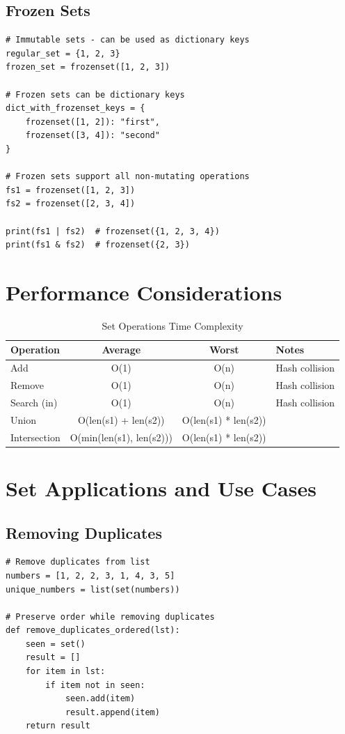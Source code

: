 \documentclass[12pt,a4paper]{article}
\begin{document}
\subsection{Frozen Sets}

\begin{lstlisting}
# Immutable sets - can be used as dictionary keys
regular_set = {1, 2, 3}
frozen_set = frozenset([1, 2, 3])

# Frozen sets can be dictionary keys
dict_with_frozenset_keys = {
    frozenset([1, 2]): "first",
    frozenset([3, 4]): "second"
}

# Frozen sets support all non-mutating operations
fs1 = frozenset([1, 2, 3])
fs2 = frozenset([2, 3, 4])

print(fs1 | fs2)  # frozenset({1, 2, 3, 4})
print(fs1 & fs2)  # frozenset({2, 3})
\end{lstlisting}

\section{Performance Considerations}

\begin{table}[h]
\centering
\begin{tabular}{|l|c|c|l|}
\hline
\textbf{Operation} & \textbf{Average} & \textbf{Worst} & \textbf{Notes} \\
\hline
Add & O(1) & O(n) & Hash collision \\
Remove & O(1) & O(n) & Hash collision \\
Search (in) & O(1) & O(n) & Hash collision \\
Union & O(len(s1) + len(s2)) & O(len(s1) * len(s2)) & \\
Intersection & O(min(len(s1), len(s2))) & O(len(s1) * len(s2)) & \\
\hline
\end{tabular}
\caption{Set Operations Time Complexity}
\end{table}

\section{Set Applications and Use Cases}

\subsection{Removing Duplicates}

\begin{lstlisting}
# Remove duplicates from list
numbers = [1, 2, 2, 3, 1, 4, 3, 5]
unique_numbers = list(set(numbers))

# Preserve order while removing duplicates
def remove_duplicates_ordered(lst):
    seen = set()
    result = []
    for item in lst:
        if item not in seen:
            seen.add(item)
            result.append(item)
    return result
\end{lstlisting}
\end{document}
